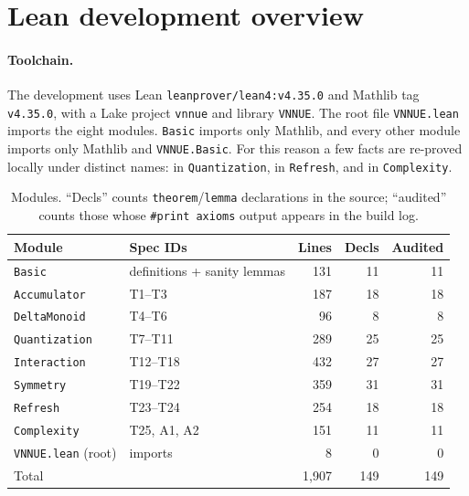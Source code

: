 \appendix

\section{Lean development overview}\label{app:lean}

\paragraph{Toolchain.}
The development uses Lean \texttt{leanprover/lean4:v4.35.0} and Mathlib tag \texttt{v4.35.0}, with a Lake project \texttt{vnnue} and library \texttt{VNNUE}.
The root file \texttt{VNNUE.lean} imports the eight modules.
\texttt{Basic} imports only Mathlib, and every other module imports only Mathlib and \texttt{VNNUE.Basic}.
For this reason a few facts are re-proved locally under distinct names:  in \texttt{Quantization},  in \texttt{Refresh}, and  in \texttt{Complexity}.

\begin{table}[h]
\centering\small
\caption{Modules. ``Decls'' counts \texttt{theorem}/\texttt{lemma} declarations in the source; ``audited'' counts those whose \texttt{\#print axioms} output appears in the build log.}\label{tab:modules}
\begin{tabular}{@{}llrrr@{}}
\toprule
Module & Spec IDs & Lines & Decls & Audited\\
\midrule
\texttt{Basic} & definitions + sanity lemmas & 131 & 11 & 11\\
\texttt{Accumulator} & T1--T3 & 187 & 18 & 18\\
\texttt{DeltaMonoid} & T4--T6 & 96 & 8 & 8\\
\texttt{Quantization} & T7--T11 & 289 & 25 & 25\\
\texttt{Interaction} & T12--T18 & 432 & 27 & 27\\
\texttt{Symmetry} & T19--T22 & 359 & 31 & 31\\
\texttt{Refresh} & T23--T24 & 254 & 18 & 18\\
\texttt{Complexity} & T25, A1, A2 & 151 & 11 & 11\\
\texttt{VNNUE.lean} (root) & imports & 8 & 0 & 0\\
\midrule
Total & & 1,907 & 149 & 149\\
\bottomrule
\end{tabular}
\end{table}

